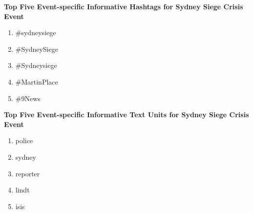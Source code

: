 \textbf{Top Five Event-specific Informative Hashtags for Sydney Siege Crisis Event}
\begin{enumerate}
\item \#sydneysiege 
\item \#SydneySiege
\item \#Sydneysiege
\item \#MartinPlace
\item \#9News                                                                                                                                                                                                                                                                                                                                                                                                                                                                                                                 
\end{enumerate}

\textbf{Top Five Event-specific Informative Text Units for Sydney Siege Crisis Event}
\begin{enumerate}
\item police
\item sydney
\item reporter
\item lindt
\item isis                                                                                                                                                                                                                                                                                                                                                                                                                                                                                                                
\end{enumerate}

